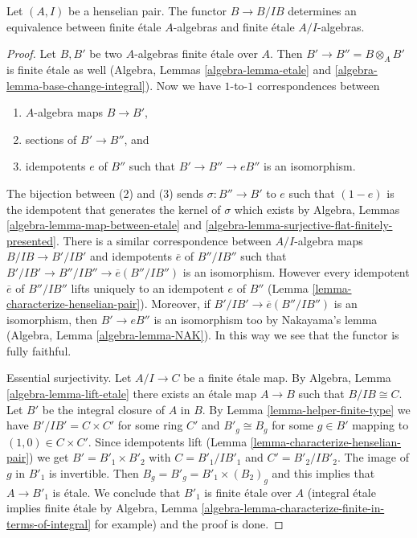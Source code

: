 \begin{lemma}
\label{lemma-finite-etale-equivalence}
Let $(A, I)$ be a henselian pair. The functor $B \to B/IB$ determines
an equivalence between finite \'etale $A$-algebras and finite \'etale
$A/I$-algebras.
\end{lemma}

\begin{proof}
Let $B, B'$ be two $A$-algebras finite \'etale over $A$.
Then $B' \to B'' = B \otimes_A B'$ is finite \'etale as well
(Algebra, Lemmas \ref{algebra-lemma-etale} and
\ref{algebra-lemma-base-change-integral}).
Now we have $1$-to-$1$ correspondences between
\begin{enumerate}
\item $A$-algebra maps $B \to B'$,
\item sections of $B' \to B''$, and
\item idempotents $e$ of $B''$ such that $B' \to B'' \to eB''$ is
an isomorphism.
\end{enumerate}
The bijection between (2) and (3) sends $\sigma : B'' \to B'$
to $e$ such that $(1 - e)$ is the idempotent
that generates the kernel of $\sigma$ which exists by
Algebra, Lemmas \ref{algebra-lemma-map-between-etale} and
\ref{algebra-lemma-surjective-flat-finitely-presented}.
There is a similar correspondence between
$A/I$-algebra maps $B/IB \to B'/IB'$ and idempotents
$\overline{e}$ of $B''/IB''$ such that
$B'/IB' \to B''/IB'' \to \overline{e}(B''/IB'')$ is
an isomorphism. However every idempotent $\overline{e}$ of $B''/IB''$
lifts uniquely to an idempotent $e$ of $B''$
(Lemma \ref{lemma-characterize-henselian-pair}).
Moreover, if $B'/IB' \to \overline{e}(B''/IB'')$ is an isomorphism,
then $B' \to eB''$ is an isomorphism too by Nakayama's lemma
(Algebra, Lemma \ref{algebra-lemma-NAK}).
In this way we see that the functor is fully faithful.

\medskip\noindent
Essential surjectivity. Let $A/I \to C$ be a finite \'etale map.
By Algebra, Lemma \ref{algebra-lemma-lift-etale}
there exists an \'etale map $A \to B$ such that $B/IB \cong C$.
Let $B'$ be the integral closure of $A$ in $B$. 
By Lemma \ref{lemma-helper-finite-type} we have
$B'/IB' = C \times C'$ for some ring $C'$
and $B'_g \cong B_g$ for some $g \in B'$ mapping to $(1, 0) \in C \times C'$.
Since idempotents lift
(Lemma \ref{lemma-characterize-henselian-pair})
we get $B' = B'_1 \times B'_2$ with $C = B'_1/IB'_1$ and $C' = B'_2/IB'_2$.
The image of $g$ in $B'_1$ is invertible.
Then $B_g = B'_g = B'_1 \times (B_2)_g$ and this implies
that $A \to B'_1$ is \'etale.
We conclude that $B'_1$ is finite \'etale over $A$
(integral \'etale implies finite \'etale by
Algebra, Lemma \ref{algebra-lemma-characterize-finite-in-terms-of-integral}
for example)
and the proof is done.
\end{proof}
